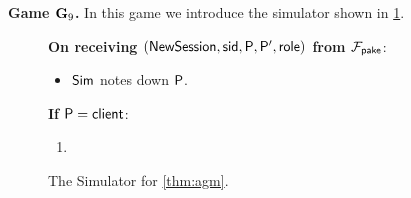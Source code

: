 \textbf{Game $\mathbf{G}_9$.} In this game we introduce the simulator shown in \cref{fig:agm-sim}.

\begin{figure}[tbp]
	\begin{framed}\small
		\textbf{On receiving $(\mathsf{NewSession}, \mathsf{sid}, \mathsf{P}, \mathsf{P}',\mathsf{role})$ from $\mathcal{F}_{\mathsf{pake}}$}:
		\begin{itemize}
			\item $\mathsf{Sim}$ notes down $\mathsf{P}$.
		\end{itemize}
	
		\textbf{If $\mathsf{P}=\mathsf{client}$}:
		
		\begin{enumerate}
			\item \textbf{}
		\end{enumerate}
	\end{framed}
	\caption{The Simulator for \cref{thm:agm}.}
	\label{fig:agm-sim}
\end{figure}